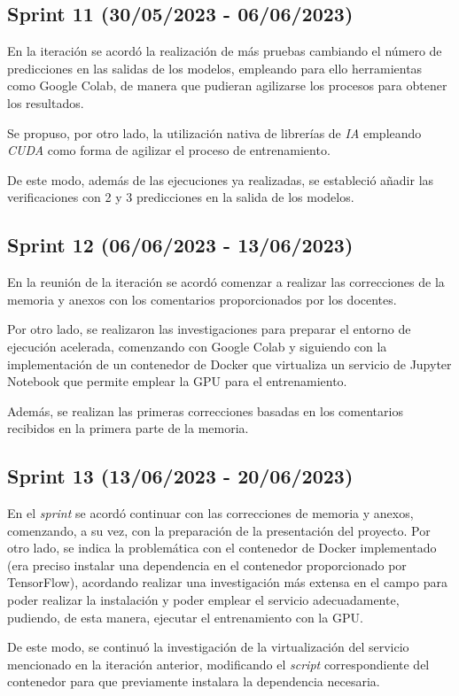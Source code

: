 \subsection{Sprint 11 (30/05/2023 - 06/06/2023)}
En la iteración se acordó la realización de más pruebas cambiando el número de predicciones en las salidas de los modelos,
empleando para ello herramientas como Google Colab, de manera que pudieran agilizarse los procesos para obtener los resultados.

Se propuso, por otro lado, la utilización nativa de librerías de \textit{IA} empleando \textit{CUDA} como forma de agilizar el
proceso de entrenamiento.

De este modo, además de las ejecuciones ya realizadas, se estableció añadir las verificaciones con 2 y 3 predicciones en la salida
de los modelos.

\subsection{Sprint 12 (06/06/2023 - 13/06/2023)}
En la reunión de la iteración se acordó comenzar a realizar las correcciones de la memoria y anexos con
los comentarios proporcionados por los docentes.

Por otro lado, se realizaron las investigaciones para preparar el entorno de ejecución acelerada,
comenzando con Google Colab y siguiendo con la implementación de un contenedor de Docker que virtualiza
un servicio de Jupyter Notebook que permite emplear la GPU para el entrenamiento.

Además, se realizan las primeras correcciones basadas en los comentarios recibidos en la primera parte
de la memoria.

\subsection{Sprint 13 (13/06/2023 - 20/06/2023)}
En el \textit{sprint} se acordó continuar con las correcciones de memoria y anexos, comenzando, a su vez,
con la preparación de la presentación del proyecto. Por otro lado, se indica la problemática con el 
contenedor de Docker implementado (era preciso instalar una dependencia en el contenedor proporcionado
por TensorFlow), acordando realizar una investigación más extensa en el campo para poder realizar la
instalación y poder emplear el servicio adecuadamente, pudiendo, de esta manera, ejecutar el entrenamiento
con la GPU.

De este modo, se continuó la investigación de la virtualización del servicio mencionado en la iteración
anterior, modificando el \textit{script} correspondiente del contenedor para que
previamente instalara la dependencia necesaria.

